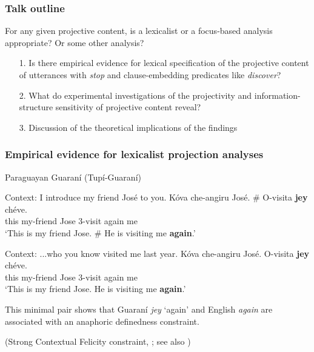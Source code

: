 \documentclass[pdf,xcolor=table,envcountsect,handout]{beamer}
\begin{document}
\begin{frame}
\frametitle{Talk outline}

For any given projective content, is a lexicalist or a focus-based analysis appropriate? Or some other analysis?

\begin{itemize}

\item[1.] \color{amber}Is there empirical evidence for lexical specification of the projective content of utterances with {\em stop} and clause-embedding predicates like {\em discover}?\color{black}

\bigskip

\item[2.] What do experimental investigations of the projectivity and information-structure sensitivity of projective content reveal? 

\bigskip

\item[3.] Discussion of the theoretical implications of the findings

\end{itemize}

\end{frame}

\begin{frame}
\frametitle{Empirical evidence for lexicalist projection analyses}

Paraguayan Guaran\'i (Tup\'i-Guaran\'i) 

\vspace*{-.2cm}

\begin{exe}

 Context: I introduce my friend Jos\'e to you. \gll K\'ova che-angiru Jos\'e. \# O-visita {\bf jey} ch\'eve. \\ this my-friend Jose {} 3-visit again me \\ \glt `This is my friend Jose. \# He is visiting me {\bf again}.'


 Context: ...who you know visited me last year. \gll K\'ova che-angiru Jos\'e. O-visita {\bf jey} ch\'eve. \\ this my-friend Jose 3-visit again me \\ \glt `This is my friend Jose. He is visiting me {\bf again}.'

\end{exe}

\medskip
This minimal pair shows that Guaran\'i {\em jey} `again' and English {\em again} are associated with an anaphoric definedness constraint. \\[-.2cm] \hfill \begin{tiny} (Strong Contextual Felicity constraint, \citealt{brst-lang11}; see also \citealt{tiemann-etal11,tiemann-etal14})\end{tiny}

\end{frame}
\end{document}
